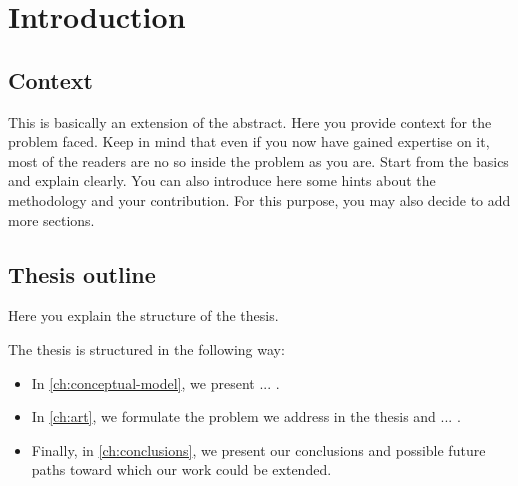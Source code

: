 \chapter{Introduction}

\section{Context}
This is basically an extension of the abstract. Here you provide context for the problem faced. Keep in mind that even if you now have gained expertise on it, most of the readers are no so inside the problem as you are. Start from the basics and explain clearly. You can also introduce here some hints about the methodology and your contribution. For this purpose, you may also decide to add more sections.

\section{Thesis outline}
Here you explain the structure of the thesis.

\begin{example}
The thesis is structured in the following way:
\begin{itemize}
\item In \autoref{ch:conceptual-model}, we present ... .
\item In \autoref{ch:art}, we formulate the problem we address in the thesis and ... .
\item Finally, in \autoref{ch:conclusions}, we present our conclusions and possible future paths toward which our work could be extended.
\end{itemize}
\end{example}
